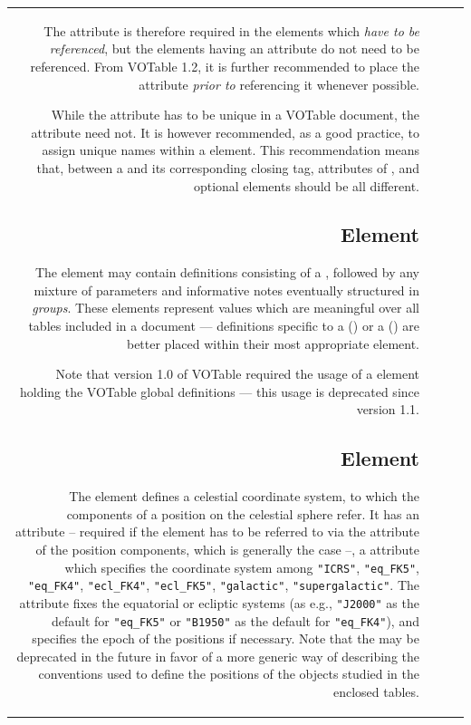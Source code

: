\begin{tabular}{RRCp{0.8\textwidth}}
\begin{center}
The {} attribute %
is therefore required in the elements which {\em have to be referenced},
but the elements having an {} attribute do not need to be
referenced.
From VOTable 1.2, it is further
recommended to place the  attribute {\em prior to} referencing
it whenever possible.

While the {} attribute has to be unique in a VOTable document,
the {} attribute need not. It is however recommended,
as a good practice, to assign unique names within a  element.
This recommendation means that,
between a  and its corresponding closing  tag,
{} attributes of ,  and
optional  elements should be all different.

\subsection{\texorpdfstring{ Element}
                           {VOTABLE Element}}
\label{sec:definitions}

The  element may contain definitions consisting of
a , followed by any mixture of parameters and
informative notes eventually structured in {\em groups}.
These elements represent values which are meaningful over all tables
included in a  document --- definitions specific to
a  ()
or a  () are better placed 
within their most appropriate element.

Note that version 1.0 of VOTable required the usage of a 
element holding the VOTable global definitions --- this
usage is deprecated since version 1.1.

\subsection{\texorpdfstring{ Element}
	{COOSYS Element}}
\label{elem:COOSYS}

The  element defines a celestial coordinate system, to
which the components of a position on the celestial sphere refer. It has
an  attribute -- required if the  element has to
be referred to via the  attribute of the position components,
which is generally the case --, a  attribute which
specifies the coordinate system among \verb|"ICRS"|, \verb|"eq_FK5"|,
\verb|"eq_FK4"|, \verb|"ecl_FK4"|, \verb|"ecl_FK5"|, \verb|"galactic"|,
\verb|"supergalactic"|. The  attribute fixes the
equatorial or ecliptic systems (as e.g., \verb|"J2000"| as the default
for \verb|"eq_FK5"| or \verb|"B1950"| as the default for
\verb|"eq_FK4"|), and  specifies the epoch of the positions
if necessary.  Note that the  may be deprecated in the
future in favor of a more generic way of describing the conventions used
to define the positions of the objects studied in the enclosed tables.


\end{center}
\end{tabular}
